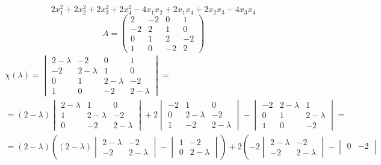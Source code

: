 $$ 2x_1^2 + 2x_2^2 + 2x_3^2 + 2x_4^2 - 4x_1x_2 + 2x_1x_4 + 2x_2x_3 - 4x_3x_4 $$
$$ A =
\begin{pmatrix}
	2 & -2 & 0 & 1 \\
    -2 & 2 & 1 & 0 \\
    0 & 1 & 2 & -2 \\
    1 & 0 & -2 & 2
\end{pmatrix} $$
\begin{multline*}
	\chi(\lambda) =
    \begin{vmatrix}
    	2 - \lambda & -2 & 0 & 1 \\
        -2 & 2 - \lambda & 1 & 0 \\
        0 & 1 & 2 - \lambda & -2 \\
        1 & 0 & -2 & 2 - \lambda
    \end{vmatrix} = \\
    = (2 - \lambda)
    \begin{vmatrix}
    	2 - \lambda & 1 & 0 \\
        1 & 2 - \lambda & -2 \\
        0 & -2 & 2 - \lambda
    \end{vmatrix} + 2
    \begin{vmatrix}
    	-2 & 1 & 0 \\
        0 & 2 - \lambda & -2 \\
        1 & -2 & 2 - \lambda
    \end{vmatrix} -
    \begin{vmatrix}
    	-2 & 2 - \lambda & 1 \\
        0 & 1 & 2 - \lambda \\
        1 & 0 & -2
    \end{vmatrix} = \\
    = (2 - \lambda) \left( (2 - \lambda)
    \begin{vmatrix}
    	2 - \lambda & -2 \\
        -2 & 2 - \lambda
    \end{vmatrix} -
    \begin{vmatrix}
    	1 & -2 \\
        0 & 2 - \lambda
    \end{vmatrix} \right) + 2 \left( -2
    \begin{vmatrix}
    	2 - \lambda & -2 \\
        -2 & 2 - \lambda
    \end{vmatrix} -
    \begin{vmatrix}
    	0 & -2 \\

\end{vmatrix}
\end{multline*}
